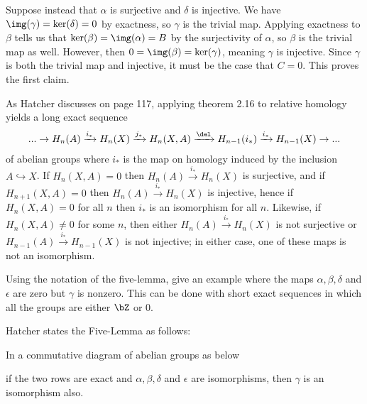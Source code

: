 \begin{homework}[e]
\begin{prf}
    Suppose instead that $\alpha$ is surjective and $\delta$ is injective. We have $\img(\gamma) = \ker(\delta) = 0$ by exactness, so $\gamma$ is the trivial map. Applying exactness to $\beta$ tells us that $\ker(\beta) = \img(\alpha) = B$ by the surjectivity of $\alpha$, so $\beta$ is the trivial map as well. However, then $ 0 = \img(\beta) = \ker(\gamma)$, meaning $\gamma$ is injective. Since $\gamma$ is both the trivial map and injective, it must be the case that $C = 0$. This proves the first claim.

    As Hatcher discusses on page 117, applying theorem 2.16 to relative homology yields a long exact sequence
    \begin{align*}
      ...\to H_n(A) \xrightarrow{i_*} H_n(X)\xrightarrow{j_*} H_n(X,A) \xrightarrow{\del} H_{n-1}(i_*) \xrightarrow{i_*} H_{n-1}(X) \to ...
    \end{align*}
    of abelian groups where $i_*$ is the map on homology induced by the inclusion $A\hookrightarrow X$. If $H_n(X,A) = 0$ then $H_n(A) \xrightarrow{i_*} H_n(X)$ is surjective, and if $H_{n+1}(X,A) = 0$ then $H_n(A) \xrightarrow{i_*} H_n(X)$ is injective, hence if $H_n(X,A) = 0$ for all $n$ then $i_*$ is an isomorphism for all $n$. Likewise, if $H_n(X,A) \neq 0$ for some $n$, then either $H_n(A) \xrightarrow{i_*} H_n(X)$ is not surjective or $H_{n-1}(A) \xrightarrow{i_*} H_{n-1}(X)$ is not injective; in either case, one of these maps is not an isomorphism.
  \end{prf}
  \prob[2.1.31] Using the notation of the five-lemma, give an example where the maps $\alpha,\beta,\delta$ and $\epsilon$ are zero but $\gamma$ is nonzero. This can be done with short exact sequences in which all the groups are either $\bZ$ or $0$.
  \begin{prf}
    Hatcher states the Five-Lemma as follows:
    \begin{lem}\label{lem:five-lemma}
      In a commutative diagram of abelian groups as below
      \begin{center}
      \end{center}
      if the two rows are exact and $\alpha,\beta, \delta$ and $\epsilon$ are isomorphisms, then $\gamma$ is an isomorphism also.
    \end{lem}


\end{prf}
\end{homework}
